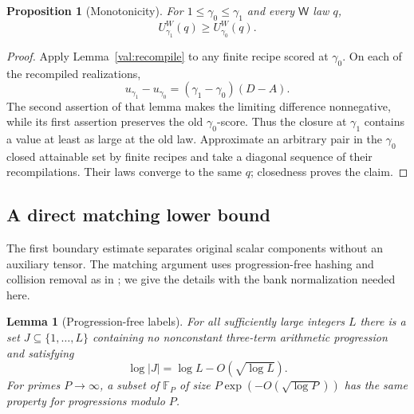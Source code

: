 \documentclass[11pt]{article}
\numberwithin{equation}{section}
\newtheorem{lemma}[theorem]{Lemma}
\newtheorem{proposition}[theorem]{Proposition}
\theoremstyle{definition}
\theoremstyle{remark}
\begin{document}
\begin{proposition}[Monotonicity]
\label{prop:monotonicity}
For $1\le\gamma_0\le\gamma_1$ and every $\mathsf W$ law $q$,
\[
 U^W_{\gamma_1}(q)\ge U^W_{\gamma_0}(q).
\]
\end{proposition}

\begin{proof}
Apply Lemma~\ref{val:recompile} to any finite recipe scored at $\gamma_0$.
On each of the recompiled realizations,
\[
 u_{\gamma_1}-u_{\gamma_0}
       =(\gamma_1-\gamma_0)(D-A).
\]
The second assertion of that lemma makes the limiting difference
nonnegative, while its first assertion preserves the old $\gamma_0$-score.
Thus the closure at $\gamma_1$ contains a value at least as large at the old
law.  Approximate an arbitrary pair in the $\gamma_0$ closed attainable set
by finite recipes and take a diagonal sequence of their recompilations.
Their laws converge to the same $q$; closedness proves the claim.
\end{proof}

\subsection{A direct matching lower bound}
\label{val:matching-section}

The first boundary estimate separates original scalar components without
an auxiliary tensor.  The matching argument uses progression-free hashing
and collision removal as in \citet[Section~6]{cw}; we give the details
with the bank normalization needed here.

\begin{lemma}[Progression-free labels]
\label{val:ap-set}
For all sufficiently large integers $L$ there is a set
$J\subseteq\{1,\ldots,L\}$ containing no nonconstant three-term arithmetic
progression and satisfying
\[
 \log|J|=\log L-O(\sqrt{\log L}).
\]
For primes $P\to\infty$, a subset of $\mathbb F_P$ of size
$P\exp(-O(\sqrt{\log P}))$ has the same property for progressions modulo
$P$.
\end{lemma}
\end{document}
